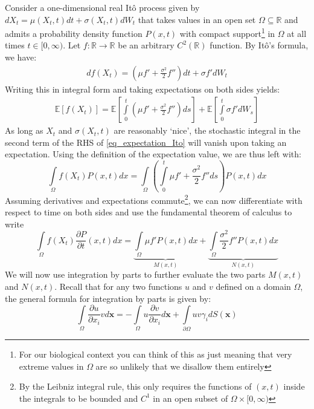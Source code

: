 Consider a one-dimensional real It\^{o} process given by $dX_t = \mu(X_t,t)dt + \sigma(X_t,t)dW_t$ that takes values in an open set $\Omega \subseteq \mathbb{R}$ and admits a probability density function $P(x,t)$ with compact support\footnote{For our biological context you can think of this as just meaning that very extreme values in $\Omega$ are so unlikely that we disallow them entirely} in $\Omega$ at all times $t \in [0,\infty)$. Let $f:\mathbb{R}\to\mathbb{R}$ be an arbitrary $C^2(\mathbb{R})$ function. By It\^{o}'s formula, we have:
\begin{align*}
	df(X_t) = \left(\mu f' + \frac{\sigma^2}{2}f''\right)dt + \sigma f' dW_t
\end{align*}
Writing this in integral form and taking expectations on both sides yields:
\begin{align}
	\label{eq_expectation_Ito}
	\mathbb{E}[f(X_t)] = \mathbb{E}\left[\int\limits_{0}^{t}\left(\mu f' + \frac{\sigma^2}{2}f''\right)ds\right] + \mathbb{E}\left[\int\limits_{0}^{t}\sigma f' dW_s\right]
\end{align}
As long as $X_t$ and $\sigma(X_t,t)$ are reasonably `nice', the stochastic integral in the second term of the RHS of \eqref{eq_expectation_Ito} will vanish upon taking an expectation. Using the definition of the expectation value, we are thus left with:
\begin{equation*}
	\int\limits_{\Omega}f(X_t)P(x,t)dx = \int\limits_{\Omega}\left(\int\limits_{0}^{t}\mu f' + \frac{\sigma^2}{2}f''ds\right)P(x,t)dx
\end{equation*}
Assuming derivatives and expectations commute\footnote{By the Leibniz integral rule, this only requires the functions of $(x,t)$ inside the integrals to be bounded and $C^1$ in an open subset of $\Omega \times [0,\infty)$}, we can now differentiate with respect to time on both sides and use the fundamental theorem of calculus to write
\begin{equation}
	\label{eq_Ito_to_FPE_for_parts}
	\int\limits_{\Omega}f(X_t)\frac{\partial P}{\partial t}(x,t)dx = \underbrace{\int\limits_{\Omega}\mu f'P(x,t)dx}_{M(x,t)} + \underbrace{\int\limits_{\Omega}\frac{\sigma^2}{2}f''P(x,t)dx}_{N(x,t)}
\end{equation}
We will now use integration by parts to further evaluate the two parts $M(x,t)$ and $N(x,t)$. Recall that for any two functions $u$ and $v$ defined on a domain $\Omega$, the general formula for integration by parts is given by:
\begin{equation}
	\label{int_by_parts_general_formula}
	\int\limits_{\Omega}\frac{\partial u}{\partial x_i}vd\mathbf{x} = -\int\limits_{\Omega}u\frac{\partial v}{\partial x_i}d\mathbf{x} + \int\limits_{\partial\Omega}uv\gamma_{i}dS(\mathbf{x})
\end{equation}
